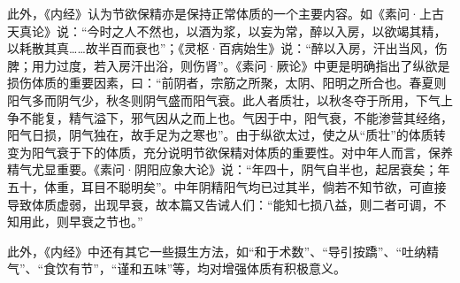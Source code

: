 \documentclass[draft,12pt]{ctexbook}
\begin{document}
此外，《内经》认为节欲保精亦是保持正常体质的一个主要内容。如《素问·上古天真论》说：“今时之人不然也，以酒为浆，以妄为常，醉以入房，以欲竭其精，以耗散其真……故半百而衰也”；《灵枢·百病始生》说：“醉以入房，汗出当风，伤脾；用力过度，若入房汗出浴，则伤肾”。《素问·厥论》中更是明确指出了纵欲是损伤体质的重要因素，曰：“前阴者，宗筋之所聚，太阴、阳明之所合也。春夏则阳气多而阴气少，秋冬则阴气盛而阳气衰。此人者质壮，以秋冬夺于所用，下气上争不能复，精气溢下，邪气因从之而上也。气因于中，阳气衰，不能渗营其经络，阳气日损，阴气独在，故手足为之寒也”。由于纵欲太过，使之从“质壮”的体质转变为阳气衰于下的体质，充分说明节欲保精对体质的重要性。对中年人而言，保养精气尤显重要。《素问·阴阳应象大论》说：“年四十，阴气自半也，起居衰矣；年五十，体重，耳目不聪明矣”。中年阴精阳气均已过其半，倘若不知节欲，可直接导致体质虚弱，出现早衰，故本篇又告诫人们：“能知七损八益，则二者可调，不知用此，则早衰之节也。”

此外，《内经》中还有其它一些摄生方法，如“和于术数”、“导引按蹻”、“吐纳精气”、“食饮有节”，“谨和五味”等，均对增强体质有积极意义。

\ifx \allfiles \undefined
\end{document}
